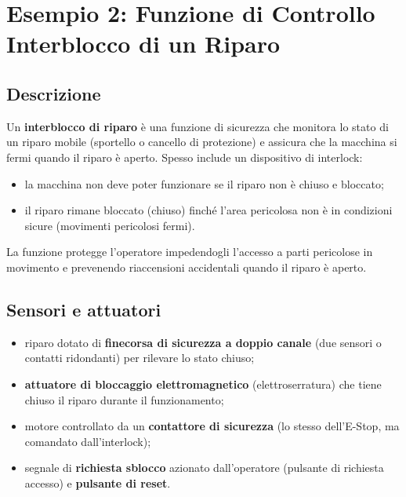 \section{Esempio 2: Funzione di Controllo Interblocco di un Riparo}
\subsection{Descrizione}
Un \textbf{interblocco di riparo} è una funzione di sicurezza che monitora lo stato di un riparo mobile (sportello o cancello di protezione) e assicura che la macchina si fermi quando il riparo è aperto. Spesso include un dispositivo di interlock:
\begin{itemize}
    \item la macchina non deve poter funzionare se il riparo non è chiuso e bloccato;
    \item il riparo rimane bloccato (chiuso) finché l'area pericolosa non è in condizioni sicure (movimenti pericolosi fermi).
\end{itemize}
La funzione protegge l'operatore impedendogli l'accesso a parti pericolose in movimento e prevenendo riaccensioni accidentali quando il riparo è aperto.

\subsection{Sensori e attuatori}
\begin{itemize}
    \item riparo dotato di \textbf{finecorsa di sicurezza a doppio canale} (due sensori o contatti ridondanti) per rilevare lo stato chiuso;
    \item \textbf{attuatore di bloccaggio elettromagnetico} (elettroserratura) che tiene chiuso il riparo durante il funzionamento;
    \item motore controllato da un \textbf{contattore di sicurezza} (lo stesso dell'E-Stop, ma comandato dall'interlock);
    \item segnale di \textbf{richiesta sblocco} azionato dall'operatore (pulsante di richiesta accesso) e \textbf{pulsante di reset}.
\end{itemize}

